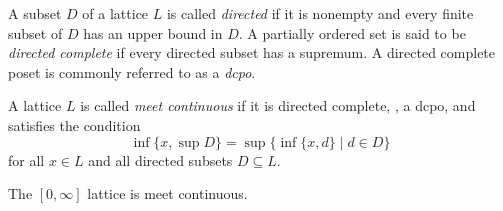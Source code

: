 \begin{comment}
\begin{definition}
  \emph{Quantales} are complete lattices equipped with an associative composition, typically denoted $\otimes$, that preserves suprema in both arguments.
\end{definition}


\begin{example}
  In this work, we consider only the standard metric quantale, whose underlying complete lattice is the interval $[0, \infty]$ ordered by $\geq$, with associative composition given by addition. Note that, since the order is reversed in this quantale, suprema in general lattices correspond to infima here, and vice versa.
\end{example}


\begin{lemma}[Way-below relation for the metric quantale] \cite{dahlqvist2023syntactic}
Let $L$ denote the complete lattice $[0, \infty]$ ordered by $\geq$.  
For all $x, y \in L$ and for every subset $X \subseteq L$, if $y > x$, then whenever $x \geq \inf X$, there exists a \emph{finite} subset $A \subseteq X$ such that $y \geq \inf A$.


This property characterizes the \emph{way-below relation} in the metric quantale. The lattice $L$ is \emph{continuous}, \ie for every $x \in L$,
	\begin{flalign*}
		x = \inf \{ y  \mid y \in L\ \text{and} \ y > x \}.
	\end{flalign*}
\end{lemma}
\end{comment}


\begin{definition}
  A subset $D$ of a lattice $L$ is called \emph{directed} if it is nonempty and every finite subset of $D$ has an upper bound in $D$. A partially ordered set is said to be \emph{directed complete} if every directed subset has a supremum. A directed complete poset is commonly referred to as a \emph{dcpo}.
\end{definition}

\begin{definition}
  A lattice $L$ is called \emph{meet continuous} if it is directed complete, \ie, a dcpo, and satisfies the condition
  \[
    \inf\{ x, \sup D \} = \sup \{ \inf \{x, d\} \mid d \in D\} 
  \]
  for all $x \in L$ and all directed subsets $D \subseteq L$.
\end{definition}

\begin{lemma} \label{lem:meet_continuos}
  The $[0, \infty]$ lattice is meet continuous.
\end{lemma}


